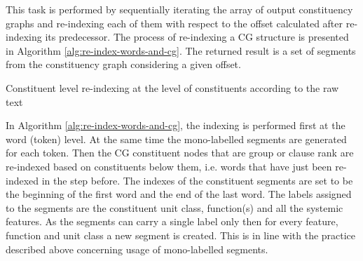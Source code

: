     This task is performed by sequentially iterating the array of output constituency graphs and re-indexing each of them with respect to the offset calculated after re-indexing its predecessor. The process of re-indexing a CG structure is presented in Algorithm \ref{alg:re-index-words-and-cg}. The returned result is a set of segments from the constituency graph considering a given offset.

    \begin{algorithm}[!ht]
        \caption{Constituent level re-indexing at the level of constituents according to the raw text}
        \label{alg:re-index-words-and-cg}
    \end{algorithm}

    In Algorithm \ref{alg:re-index-words-and-cg}, the indexing is performed first at the word (token) level. At the same time the mono-labelled segments are generated for each token. Then the CG constituent nodes that are group or clause rank are re-indexed based on constituents below them, i.e. words that have just been re-indexed in the step before. The indexes of the constituent segments are set to be the beginning of the first word and the end of the last word. The labels assigned to the segments are the constituent unit class, function(s) and all the systemic features. As the segments can carry a single label only then for every feature, function and unit class a new segment is created. This is in line with the practice described above concerning usage of mono-labelled segments.

